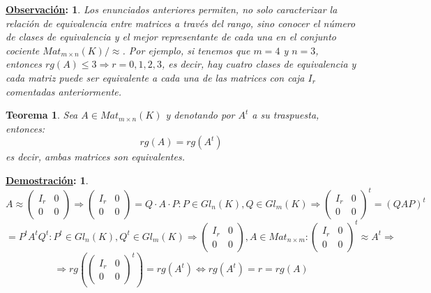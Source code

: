 \documentclass[10pt,a4paper,openright]{book}
\theoremstyle{break}
\newtheorem*{theo}{Teorema}
\newtheorem*{demo}{\underline{Demostración}:}
\newtheorem*{obs}{\underline{Observación}:}
\begin{document}
\begin{obs}
Los enunciados anteriores permiten, no solo caracterizar la relación de equivalencia entre matrices a través del rango, sino conocer el número de clases de equivalencia y el mejor representante de cada una en el conjunto cociente $Mat_{m\times n}(K)/\approx $. Por ejemplo, si tenemos que $m=4$ y $n=3$, entonces $rg(A)\leq 3\Rightarrow r=0,1,2,3$, es decir, hay cuatro clases de equivalencia y cada matriz puede ser equivalente a cada una de las matrices con caja $I_r$ comentadas anteriormente.
\end{obs}

\begin{theo}
Sea $A \in Mat_{m\times n}(K)$ y denotando por $A^t$ a su traspuesta, entonces:
$$
rg(A)=rg(A^t)
$$
es decir, ambas matrices son equivalentes.
\end{theo}
\begin{demo}
$$A\approx \left(\begin{array}{c|c} I_r & 0  \\ \hline 0 & 0 \end{array}\right)\Rightarrow \left(\begin{array}{c|c} I_r & 0  \\ \hline 0 & 0 \end{array}\right)= Q\cdot A \cdot P: P\in Gl_n(K), Q\in Gl_m(K)\Rightarrow \left(\begin{array}{c|c} I_r & 0  \\ \hline 0 & 0 \end{array}\right)^t= (QAP)^t$$
$$=P^tA^tQ^t: P^t\in Gl_n(K), Q^t\in Gl_m(K)\Rightarrow \left(\begin{array}{c|c} I_r & 0  \\ \hline 0 & 0 \end{array}\right), A\in Mat_{n\times m}: \left(\begin{array}{c|c} I_r & 0  \\ \hline 0 & 0 \end{array}\right)^t \approx A^t \Rightarrow$$
$$\Rightarrow rg\left(\left(\begin{array}{c|c} I_r & 0  \\ \hline 0 & 0 \end{array}\right)^t\right)=rg(A^t)\Leftrightarrow rg(A^t)=r=rg(A)$$
\end{demo}
\end{document}
